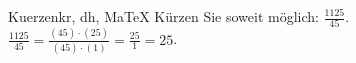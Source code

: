 \begin{MAufgabe}{Kuerzen}{kr, dh, MaTeX}
K\"urzen Sie soweit m\"oglich: $\frac{1125}{45}$.\\ 
\ifLsg\MLoesung
\quad $\frac{1125}{45}=\frac{(45)\cdot(25)}{(45)\cdot(1)}=\frac{25}{1}=25$.\else\relax\fi
 \end{MAufgabe}